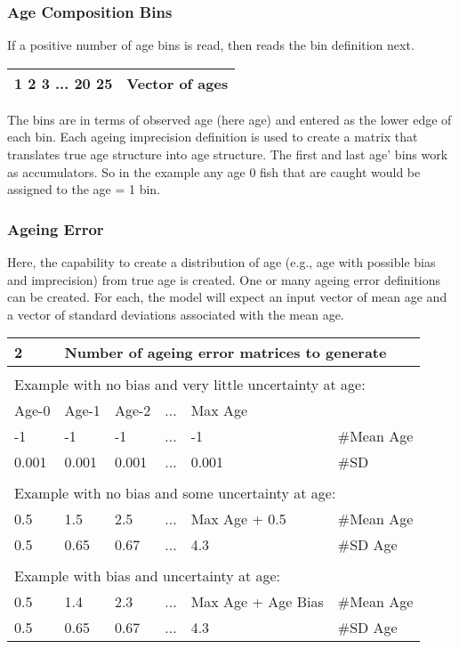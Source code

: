 \subsubsection{Age Composition Bins}
If a positive number of age bins is read, then reads the bin definition next.
\begin{center}
	\begin{tabular}{p{3cm} p{12cm}  }
		\hline
		1 2 3 ... 20 25 & Vector of ages\Tstrut\Bstrut\\
		\hline		
	\end{tabular}
\end{center}
The bins are in terms of observed age (here age) and entered as the lower edge of each bin. Each ageing imprecision definition is used to create a matrix that translates true age structure into age structure. The first and last age' bins work as accumulators.  So in the example any age 0 fish that are caught would be assigned to the age = 1 bin.

\subsubsection{Ageing Error}
Here, the capability to create a distribution of age (e.g., age with possible bias and imprecision) from true age is created. One or many ageing error definitions can be created. For each, the model will expect an input vector of mean age and a vector of standard deviations associated with the mean age. 

\begin{center}
	\begin{tabular}{p{2cm} p{2cm} p{2cm} p{2cm} p{3.5cm} p{2.5cm} }
		\hline
		\multicolumn{1}{l}{2} & \multicolumn{5}{l}{Number of ageing error matrices to generate}\Tstrut\Bstrut\\
		\hline\\
		\multicolumn{6}{l}{Example with no bias and very little uncertainty at age:}\Tstrut\Bstrut\\
		\hline
		Age-0 & Age-1 & Age-2  &  ... & Max Age & \Tstrut\Bstrut\\
		\hline
		-1 & -1 & -1  & ... & -1  & \#Mean Age\Tstrut\\
		0.001 & 0.001 & 0.001 & ... & 0.001 & \#SD\Bstrut\\
		\hline\\
		\multicolumn{6}{l}{Example with no bias and some uncertainty at age:}\Tstrut\Bstrut\\
		\hline
		0.5 & 1.5 & 2.5 & ... & Max Age + 0.5 & \#Mean Age\Tstrut\\
		0.5 & 0.65 & 0.67 & ... & 4.3 & \#SD Age\Bstrut\\
		\hline\\
		\multicolumn{6}{l}{Example with bias and uncertainty at age:}\Tstrut\Bstrut\\
		\hline
		0.5 & 1.4 & 2.3 & ... & Max Age + Age Bias & \#Mean Age\Tstrut\\
		0.5 & 0.65 & 0.67 & ... & 4.3 & \#SD Age\Bstrut\\
		\hline
	\end{tabular}
\end{center}

